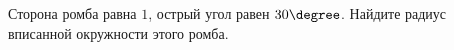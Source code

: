 \begin{ex}
	\begin{condition}
		Сторона ромба равна \( 1 \), острый угол равен \( 30 \degree\). Найдите радиус вписанной окружности этого ромба.
	\end{condition}
\end{ex}